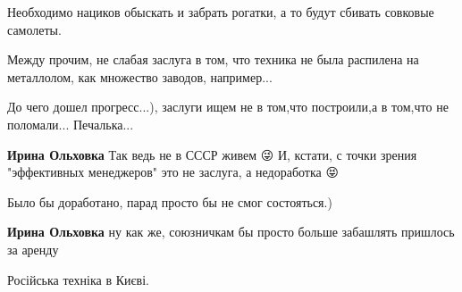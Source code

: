 \begin{itemize}
Необходимо нациков обыскать и забрать рогатки, а то будут сбивать совковые
самолеты.

 
Между прочим, не слабая заслуга в том, что техника не была распилена на
металлолом, как множество заводов, например...

\begin{itemize}
 
До чего дошел прогресс...), заслуги ищем не в том,что построили,а в том,что не поломали... Печалька...

 
\textbf{Ирина Ольховка} Так ведь не в СССР живем 😜
И, кстати, с точки зрения "эффективных менеджеров" это не заслуга, а недоработка 😝

 
Было бы доработано, парад просто бы не смог состояться.)

 
\textbf{Ирина Ольховка} ну как же, союзничкам бы просто больше забашлять пришлось за аренду
\end{itemize}

 
Російська техніка в Києві.

\begin{itemize}
 

\end{itemize}
\end{itemize}
